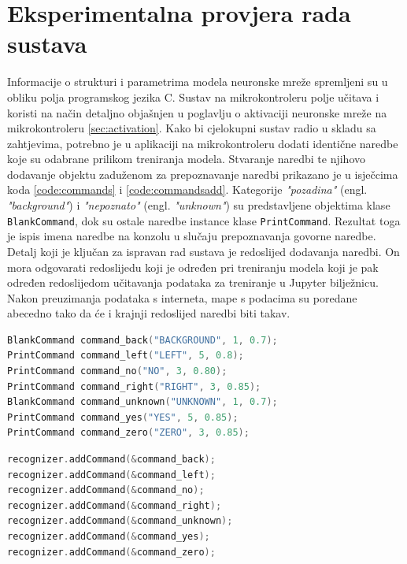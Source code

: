 \chapter{Eksperimentalna provjera rada sustava}
\label{pog:implement}

Informacije o strukturi i parametrima modela neuronske mreže spremljeni su u obliku polja
programskog jezika C. Sustav na mikrokontroleru polje učitava i koristi na način detaljno 
objašnjen 
u poglavlju o aktivaciji neuronske mreže na mikrokontroleru \ref{sec:activation}.
Kako bi cjelokupni sustav radio u skladu sa zahtjevima, potrebno je u aplikaciji
na mikrokontroleru dodati identične naredbe koje su odabrane prilikom treniranja
modela. Stvaranje naredbi te njihovo dodavanje objektu zaduženom za prepoznavanje
naredbi prikazano je u isječcima koda \ref{code:commands} i \ref{code:commandsadd}.
Kategorije \textit{"pozadina"}
 (engl. \textit{"background"}) i
\textit{"nepoznato"} (engl. \textit{"unknown"}) su predstavljene objektima klase \texttt{BlankCommand}, 
dok su ostale naredbe 
instance klase \texttt{PrintCommand}. Rezultat toga je ispis imena naredbe na konzolu u slučaju
prepoznavanja govorne naredbe. Detalj koji je ključan za ispravan rad sustava je redoslijed
dodavanja naredbi. On mora odgovarati redoslijedu koji je određen pri treniranju modela koji
je pak određen redoslijedom učitavanja podataka za treniranje u Jupyter bilježnicu. Nakon
preuzimanja podataka s interneta, mape s podacima su poredane abecedno tako da 
će i krajnji redoslijed naredbi biti takav.

\begin{lstlisting}[language=C++, caption=Stvaranje naredbi, label=code:commands]
BlankCommand command_back("BACKGROUND", 1, 0.7);
PrintCommand command_left("LEFT", 5, 0.8);
PrintCommand command_no("NO", 3, 0.80);
PrintCommand command_right("RIGHT", 3, 0.85);
BlankCommand command_unknown("UNKNOWN", 1, 0.7);
PrintCommand command_yes("YES", 5, 0.85);
PrintCommand command_zero("ZERO", 3, 0.85);
\end{lstlisting}

\newpage
\begin{lstlisting}[language=C++, caption=Dodavanje naredbi, label=code:commandsadd]
recognizer.addCommand(&command_back);
recognizer.addCommand(&command_left);
recognizer.addCommand(&command_no);
recognizer.addCommand(&command_right);
recognizer.addCommand(&command_unknown);
recognizer.addCommand(&command_yes);
recognizer.addCommand(&command_zero);
\end{lstlisting}

